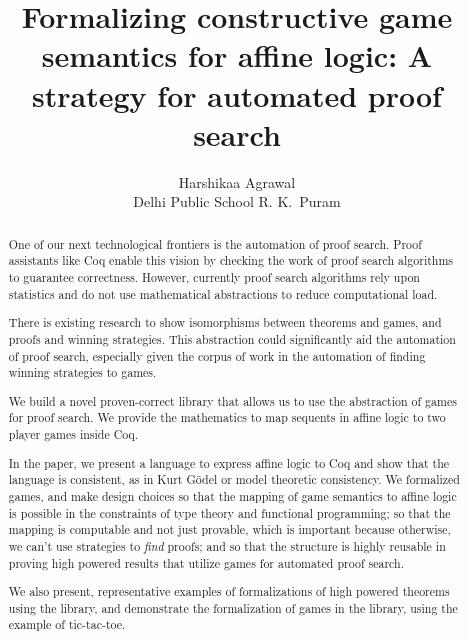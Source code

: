 \documentclass{article}
\title{Formalizing constructive game semantics for affine logic: A strategy for automated proof search}
\author{Harshikaa Agrawal \\ \small Delhi Public School R. K.\ Puram}
\date{}
\theoremstyle{definition}
\begin{document}
\linespread{1.28}

\maketitle

\begin{abstract}
    

One of our next technological frontiers is the automation of proof search. Proof assistants like Coq enable this vision by checking the work of proof search algorithms to guarantee correctness. However, currently proof search algorithms rely upon statistics and do not use mathematical abstractions to reduce computational load. 

There is existing research to show isomorphisms between theorems and games, and proofs and winning strategies. This abstraction could significantly aid the automation of proof search, especially given the corpus of work in the automation of finding winning strategies to games.

We build a novel proven-correct library that allows us to use the abstraction of games for proof search. We provide the mathematics to map sequents in affine logic to two player games inside Coq. 

In the paper, we present a language to express affine logic to Coq and show that the language is consistent, as in Kurt Gödel or model theoretic consistency.  We formalized games, and make design choices so that the mapping of game semantics to affine logic is possible in the constraints of type theory and functional programming; so that the mapping is computable and not just provable, which is important because otherwise, we can’t use strategies to \emph{find} proofs; and so that the structure is highly reusable in proving high powered results that utilize games for automated proof search.

We also present, representative examples of formalizations of high powered theorems using the library, and demonstrate the formalization of games in the library, using the example of tic-tac-toe.

\end{abstract}

\clearpage
\begin{doublespace}
\tableofcontents
\end{doublespace}

\begin{comment}

Table of contents
Introduction: Opportunity, Our Idea, Our Contribution
Project Background: Proof Assistants, Affine Logic, Modelling proofs through game semantics, Summary
Library Design: Affine Logic, Model of Affine Logic, Formal Game, Seminal definition 
Examples: Theorems, Games
Acknowledgments 
Bibliography
\end{comment}
\end{document}
